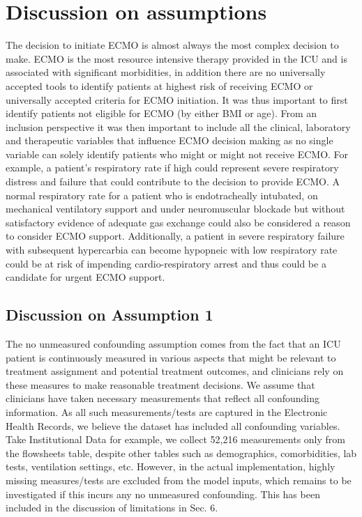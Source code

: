 \appendix
\section{Discussion on assumptions}
The decision to initiate ECMO is almost always the most complex decision to make. ECMO is the most resource intensive therapy provided in the ICU and is associated with significant morbidities, in addition there are no universally accepted tools to identify patients at highest risk of receiving ECMO or universally accepted criteria for ECMO initiation. It was thus important to first identify patients not eligible for ECMO (by either BMI or age). From an inclusion perspective it was then important to include all the clinical, laboratory and therapeutic variables that influence ECMO decision making as no single variable can solely identify patients who might or might not receive ECMO. For example, a patient’s respiratory rate if high could represent severe respiratory distress and failure that could contribute to the decision to provide ECMO. A normal respiratory rate for a patient who is endotracheally intubated, on mechanical ventilatory support and under neuromuscular blockade but without satisfactory evidence of adequate gas exchange could also be considered a reason to consider ECMO support. Additionally, a patient in severe respiratory failure with subsequent hypercarbia can become hypopneic with low respiratory rate could be at risk of impending cardio-respiratory arrest and thus could be a candidate for urgent ECMO support.

\subsection{Discussion on Assumption 1}
The no unmeasured confounding assumption comes from the fact that an ICU patient is continuously measured in various aspects that might be relevant to treatment assignment and potential treatment outcomes, and clinicians rely on these measures to make reasonable treatment decisions. We assume that clinicians have taken necessary measurements that reflect all confounding information. As all such measurements/tests are captured in the Electronic Health Records, we believe the dataset has included all confounding variables. Take Institutional Data for example, we collect 52,216 measurements only from the flowsheets table, despite other tables such as demographics, comorbidities, lab tests, ventilation settings, etc. However, in the actual implementation, highly missing measures/tests are excluded from the model inputs, which remains to be investigated if this incurs any no unmeasured confounding. This has been included in the discussion of limitations in Sec. 6. 

